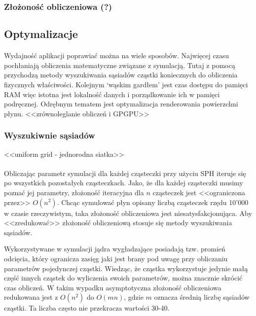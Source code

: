\paragraph{}

\par

\subsubsection{Złożoność obliczeniowa (?)}

\paragraph{}

\par


\subsection{Optymalizacje}

\paragraph{}
Wydajność aplikacji poprawiać można na wiele sposobów. Najwięcej czasu pochłaniają obliczenia matematyczne związane z symulacją. Tutaj z pomocą przychodzą metody wyszukiwania sąsiadów cząstki koniecznych do obliczenia fizycznych właściwości. Kolejnym `wąskim gardłem' jest czas dostępu do pamięci RAM więc istotna jest lokalność danych i porządkowanie ich w pamięci podręcznej. Odrębnym tematem jest optymalizacja renderowania powierzchni płynu. <<zrównoleglanie obliczeń i GPGPU>>
\par

\subsubsection{Wyszukiwnie sąsiadów}
\label{subsubsec:neighbour_search}
<<uniform grid - jednorodna siatka>>
\paragraph{}
Obliczając parametr symulacji dla każdej cząsteczki przy użyciu SPH iteruje się po wszystkich pozostałych cząsteczkach. Jako, że dla każdej cząsteczki musimy poznać jej parametry, złożoność iteracyjna dla $n$ cząsteczek jest <<ograniczona przez>> $O(n^2)$. Chcąc symulować płyn opisany liczbą cząsteczek rzędu 10'000 w czasie rzeczywistym, taka złożoność obliczeniowa jest niesatysfakcjonująca. Aby <<zredukować>> złożoność obliczeniową stosuje się metody wyszukiwania sąsiadów.
\par
Wykorzystywane w symulacji jądra wygładzające posiadają tzw. promień odcięcia, który ogranicza zasięg jaki jest brany pod uwagę przy obliczaniu parametrów pojedynczej cząstki. Wiedząc, że cząstka wykorzystuje jedynie małą część innych cząstek do wyliczenia swoich parametrów, można znacznie skrócić czas obliczeń. W takim wypadku asymptotyczna złożoność obliczeniowa redukowana jest z $O(n^2)$ do $O(mn)$, gdzie $m$ oznacza średnią liczbę sąsiadów cząstki. Ta liczba często nie przekracza wartości 30-40.
\par

